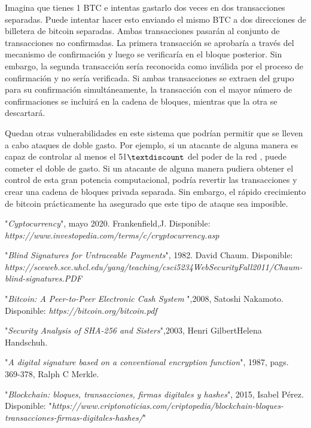 \documentclass[11pt]{article} %
\begin{document}
Imagina que tienes 1 BTC e intentas gastarlo dos veces en dos transacciones separadas. Puede intentar hacer esto enviando el mismo BTC a dos direcciones de billetera de bitcoin separadas. Ambas transacciones pasarán al conjunto de transacciones no confirmadas. La primera transacción se aprobaría a través del mecanismo de confirmación y luego se verificaría en el bloque posterior. Sin embargo, la segunda transacción sería reconocida como inválida por el proceso de confirmación y no sería verificada. Si ambas transacciones se extraen del grupo para su confirmación simultáneamente, la transacción con el mayor número de confirmaciones se incluirá en la cadena de bloques, mientras que la otra se descartará.

Quedan otras vulnerabilidades en este sistema que podrían permitir que se lleven a cabo ataques de doble gasto. Por ejemplo, si un atacante de alguna manera es capaz de controlar al menos el 51$\textdiscount$ del poder de la red , puede cometer el doble de gasto. Si un atacante de alguna manera pudiera obtener el control de esta gran potencia computacional, podría revertir las transacciones y crear una cadena de bloques privada separada. Sin embargo, el rápido crecimiento de bitcoin prácticamente ha asegurado que este tipo de ataque sea imposible.
\newpage

\begin{thebibliography}{999999}
	
	 "\textit{Cyptocurrency}", mayo 2020. Frankenfield,J. Disponible: \textit{https://www.investopedia.com/terms/c/cryptocurrency.asp}
	
	 "\textit{Blind Signatures for Untraceable Payments}", 1982. David Chaum. Disponible: \textit{https://sceweb.sce.uhcl.edu/yang/teaching/csci5234WebSecurityFall2011/Chaum-blind-signatures.PDF}
	
	 "\textit{Bitcoin: A Peer-to-Peer Electronic Cash System }",2008, Satoshi Nakamoto. Disponible:
	\textit{https://bitcoin.org/bitcoin.pdf} 
	
	 "\textit{Security Analysis of SHA-256 and Sisters}",2003, Henri GilbertHelena Handschuh.
	
	 "\textit{A digital signature based on a conventional encryption function}", 1987, pags. 369-378, Ralph C Merkle.
	
	 "\textit{Blockchain: bloques, transacciones, firmas digitales y hashes}", 2015,  Isabel Pérez.
	Disponible: "\textit{https://www.criptonoticias.com/criptopedia/blockchain-bloques-transacciones-firmas-digitales-hashes/}"
		
\end{thebibliography}
\end{document}
